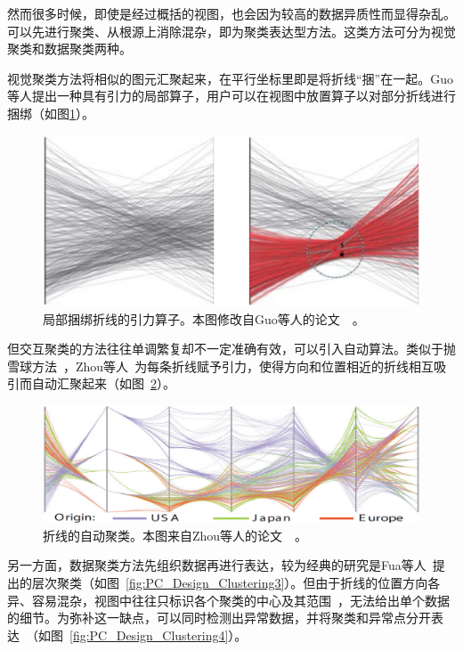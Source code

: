 \documentclass[12pt,twocolumn]{article}
\begin{document}
然而很多时候，即使是经过概括的视图，也会因为较高的数据异质性而显得杂乱。可以先进行聚类、从根源上消除混杂，即为聚类表达型方法。这类方法可分为视觉聚类和数据聚类两种。

视觉聚类方法将相似的图元汇聚起来，在平行坐标里即是将折线“捆”在一起。Guo等人\citep{guo2010interactive}提出一种具有引力的局部算子，用户可以在视图中放置算子以对部分折线进行捆绑（如图\ref{fig:PC_Design_Clustering1}）。

\begin{figure}[!htb]
\centering
\includegraphics[width=0.85\linewidth]{images/PC_Design_Clustering1.eps}
\caption{\label{fig:PC_Design_Clustering1}局部捆绑折线的引力算子。本图修改自Guo等人的论文~\citep{guo2010interactive}~。
}
\end{figure}

但交互聚类的方法往往单调繁复却不一定准确有效，可以引入自动算法。类似于抛雪球方法~\citep{zhou2009splatting}，Zhou等人~\citep{zhou2008visual}为每条折线赋予引力，使得方向和位置相近的折线相互吸引而自动汇聚起来（如图~\ref{fig:PC_Design_Clustering2}）。

\begin{figure}[!htb]
\centering
\includegraphics[width=0.93\linewidth]{images/PC_Design_Clustering5.eps}
\caption{\label{fig:PC_Design_Clustering2}折线的自动聚类。本图来自Zhou等人的论文~\citep{zhou2008visual}~。
}
\end{figure}

另一方面，数据聚类方法先组织数据再进行表达，较为经典的研究是Fua等人~\citep{fua1999hierarchical}提出的层次聚类（如图~\ref{fig:PC_Design_Clustering3}）。但由于折线的位置方向各异、容易混杂，视图中往往只标识各个聚类的中心及其范围~\citep{siirtola2000direct}，无法给出单个数据的细节。为弥补这一缺点，可以同时检测出异常数据，并将聚类和异常点分开表达~\citep{novotny2006outlier}（如图~\ref{fig:PC_Design_Clustering4}）。
\end{document}

